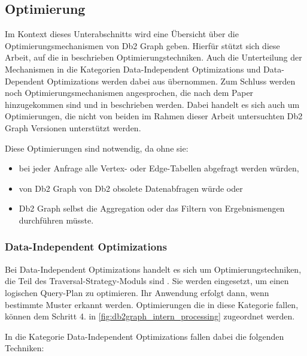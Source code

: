 \subsection{Optimierung}
\label{db2graph:optimierung}

Im Kontext dieses Unterabschnitts wird eine Übersicht über die Optimierungsmechanismen von Db2 Graph geben. Hierfür stützt sich diese Arbeit, auf die in \cite{sigmod_tian} beschrieben Optimierungstechniken. Auch die Unterteilung der Mechanismen in die Kategorien Data-Independent Optimizations und Data-Dependent Optimizations werden dabei aus \cite{sigmod_tian} übernommen. Zum Schluss werden noch Optimierungsmechanismen angesprochen, die nach dem Paper \cite{sigmod_tian} hinzugekommen sind und in \cite{ibm_docs_optimize} beschrieben werden. Dabei handelt es sich auch um Optimierungen, die nicht von beiden im Rahmen dieser Arbeit untersuchten Db2 Graph Versionen unterstützt werden. 

Diese Optimierungen sind notwendig, da ohne sie:

\begin{itemize}
    \item bei jeder Anfrage alle Vertex- oder Edge-Tabellen abgefragt werden würden, 
    \item von Db2 Graph von Db2 obsolete Datenabfragen würde oder 
    \item Db2 Graph selbst die Aggregation oder das Filtern von Ergebnismengen durchführen müsste.
\end{itemize}

\subsubsection{Data-Independent Optimizations}
\label{subsubsec:data_independent_optimizations}
Bei Data-Independent Optimizations handelt es sich um Optimierungstechniken, die Teil des Traversal-Strategy-Moduls sind \cite{sigmod_tian}. Sie werden eingesetzt, um einen logischen Query-Plan zu optimieren. Ihr Anwendung erfolgt dann, wenn bestimmte Muster erkannt werden. Optimierungen die in diese Kategorie fallen, können dem Schritt 4. in \autoref{fig:db2graph_intern_processing} zugeordnet werden. 

In die Kategorie Data-Independent Optimizations fallen dabei die folgenden Techniken: 

